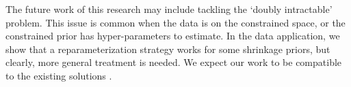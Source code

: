 \documentclass[10pt,fleqn]{article}
\DeclareMathOperator{\1}{\mathbbm{1}}
\begin{document}
The future work of this research may include tackling the  `doubly intractable' problem. This issue is common when the data is on the constrained space, or the constrained prior has hyper-parameters to estimate. In the data application, we show that a reparameterization strategy works for some shrinkage priors, but clearly, 
more general treatment is needed. We expect our work to be compatible to the existing solutions \citep{murray2012mcmc,rao2016data, stoehr2017noisy}. 



\end{document}
